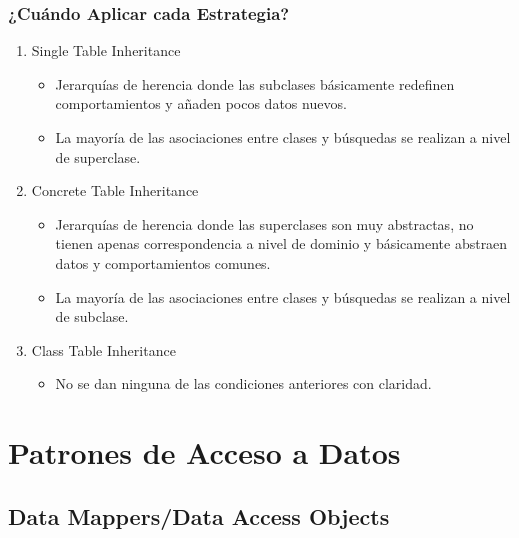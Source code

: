 \documentclass[a4paper,slidestop,xcolor=pst,blue]{beamer}
\begin{document}
\begin{frame}[c]
    \frametitle{¿Cuándo Aplicar cada Estrategia?}
    \begin{enumerate}
        \item<1-> Single Table Inheritance
            \begin{itemize}
                \item<2-> Jerarquías de herencia donde las subclases básicamente redefinen comportamientos y añaden pocos datos nuevos.
                \item<3-> La mayoría de las asociaciones entre clases y búsquedas se realizan a nivel de superclase.
            \end{itemize}
        \item<4-> Concrete Table Inheritance
            \begin{itemize}
                \item<5-> Jerarquías de herencia donde las superclases son muy abstractas, no tienen apenas correspondencia a nivel de dominio y básicamente abstraen datos y comportamientos comunes.
                \item<6-> La mayoría de las asociaciones entre clases y búsquedas se realizan a nivel de subclase.
            \end{itemize}
        \item<7-> Class Table Inheritance
            \begin{itemize}
                \item<8-> No se dan ninguna de las condiciones anteriores con claridad.
            \end{itemize}
    \end{enumerate}
\end{frame}

\section{Patrones de Acceso a Datos}

\subsection{Data Mappers/Data Access Objects}

\end{document}
